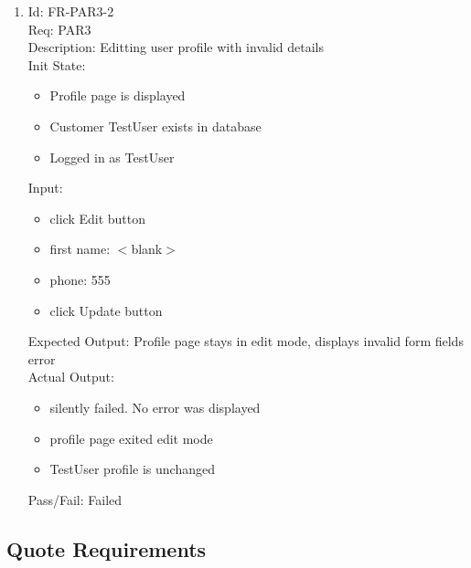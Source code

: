 \documentclass[12pt, titlepage]{article}
\begin{document}
\begin{enumerate}
    \item Id: FR-PAR3-2\\
    Req: PAR3\\
    Description: Editting user profile with invalid details\\
    Init State: \begin{itemize}[noitemsep,topsep=0pt]
        \item Profile page is displayed
        \item Customer TestUser exists in database
        \item Logged in as TestUser
    \end{itemize}
    Input: \begin{itemize}[noitemsep,topsep=0pt]
        \item click Edit button
        \item first name: $<$blank$>$
        \item phone: 555
        \item click Update button
    \end{itemize}
    Expected Output: Profile page stays in edit mode, displays invalid form fields error\\ 
    Actual Output: \begin{itemize}[noitemsep,topsep=0pt]
        \item silently failed. No error was displayed
        \item profile page exited edit mode
        \item TestUser profile is unchanged
    \end{itemize}
    Pass/Fail: Failed
\end{enumerate}

    \subsection{Quote Requirements}
\end{document}
